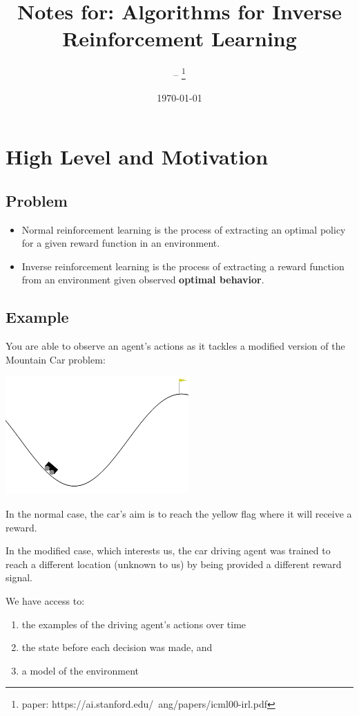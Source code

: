 \documentclass{article}
\title{Notes for: Algorithms for Inverse Reinforcement Learning}
\author{-- \thanks{paper: https://ai.stanford.edu/~ang/papers/icml00-irl.pdf}}
\date{\today}
\begin{document}
    \maketitle
    
    \section{High Level and Motivation}

    \subsection{Problem}
    
    \begin{itemize}
        \item Normal reinforcement learning is the process of extracting an optimal policy for a given reward function in an environment.
        \item Inverse reinforcement learning is the process of extracting a reward function from an environment given observed \textbf{optimal behavior}.
    \end{itemize}
    
    \subsection{Example}
    You are able to observe an agent's actions as it tackles a modified version of the Mountain Car problem:


    \includegraphics[width=7cm]{fig1.png}


    In the normal case, the car's aim is to reach the yellow flag where it will receive a reward.

    In the modified case, which interests us, the car driving agent was trained to reach a different location (unknown to us) by being provided a different reward signal. 

    We have access to:

    \begin{enumerate}
        \item the examples of the driving agent's actions over time
        \item the state before each decision was made, and
        \item a model of the environment
    \end{enumerate}
\end{document}
